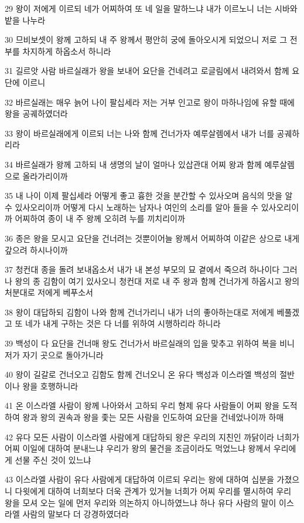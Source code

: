 \par 29 왕이 저에게 이르되 네가 어찌하여 또 네 일을 말하느냐 내가 이르노니 너는 시바와 밭을 나누라
\par 30 므비보셋이 왕께 고하되 내 주 왕께서 평안히 궁에 돌아오시게 되었으니 저로 그 전부를 차지하게 하옵소서 하니라
\par 31 길르앗 사람 바르실래가 왕을 보내어 요단을 건네려고 로글림에서 내려와서 함께 요단에 이르니
\par 32 바르실래는 매우 늙어 나이 팔십세라 저는 거부 인고로 왕이 마하나임에 유할 때에 왕을 공궤하였더라
\par 33 왕이 바르실래에게 이르되 너는 나와 함께 건너가자 예루살렘에서 내가 너를 공궤하리라
\par 34 바르실래가 왕께 고하되 내 생명의 날이 얼마나 있삽관대 어찌 왕과 함께 예루살렘으로 올라가리이까
\par 35 내 나이 이제 팔십세라 어떻게 좋고 흉한 것을 분간할 수 있사오며 음식의 맛을 알 수 있사오리이까 어떻게 다시 노래하는 남자나 여인의 소리를 알아 들을 수 있사오리이까 어찌하여 종이 내 주 왕께 오히려 누를 끼치리이까
\par 36 종은 왕을 모시고 요단을 건너려는 것뿐이어늘 왕께서 어찌하여 이같은 상으로 내게 갚으려 하시나이까
\par 37 청컨대 종을 돌려 보내옵소서 내가 내 본성 부모의 묘 곁에서 죽으려 하나이다 그러나 왕의 종 김함이 여기 있사오니 청컨대 저로 내 주 왕과 함께 건너가게 하옵시고 왕의 처분대로 저에게 베푸소서
\par 38 왕이 대답하되 김함이 나와 함께 건너가리니 내가 너의 좋아하는대로 저에게 베풀겠고 또 네가 내게 구하는 것은 다 너를 위하여 시행하리라 하니라
\par 39 백성이 다 요단을 건너매 왕도 건너가서 바르실래의 입을 맞추고 위하여 복을 비니 저가 자기 곳으로 돌아가니라
\par 40 왕이 길갈로 건너오고 김함도 함께 건너오니 온 유다 백성과 이스라엘 백성의 절반이나 왕을 호행하니라
\par 41 온 이스라엘 사람이 왕께 나아와서 고하되 우리 형제 유다 사람들이 어찌 왕을 도적하여 왕과 왕의 권속과 왕을 좇는 모든 사람을 인도하여 요단을 건네었나이까 하매
\par 42 유다 모든 사람이 이스라엘 사람에게 대답하되 왕은 우리의 지친인 까닭이라 너희가 어찌 이일에 대하여 분내느냐 우리가 왕의 물건을 조금이라도 먹었느냐 왕께서 우리에게 선물 주신 것이 있느냐
\par 43 이스라엘 사람이 유다 사람에게 대답하여 이르되 우리는 왕에 대하여 십분을 가졌으니 다윗에게 대하여 너희보다 더욱 관계가 있거늘 너희가 어찌 우리를 멸시하여 우리 왕을 모셔 오는 일에 먼저 우리와 의논하지 아니하였느냐 하나 유다 사람의 말이 이스라엘 사람의 말보다 더 강경하였더라

